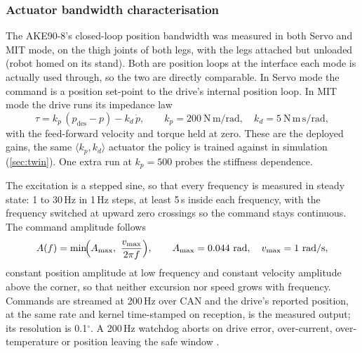 \newpage 

\subsubsection{Actuator bandwidth characterisation}
\label{sec:plant-id-drive}

The AKE90-8's closed-loop position bandwidth was measured in both Servo and MIT mode, on the
thigh joints of both legs, with the legs attached but unloaded (robot homed on its stand). Both are position loops at the interface each mode is actually used through, so the two are
directly comparable. In Servo mode the command is a position set-point to the drive's internal
position loop. In MIT mode the drive runs its impedance law
\begin{equation}
\tau = k_p\,(p_{\mathrm{des}} - p) - k_d\,\dot p,
\qquad k_p = 200\ \mathrm{N\,m/rad},\quad k_d = 5\ \mathrm{N\,m\,s/rad},
\label{eq:mit-impedance}
\end{equation}
with the feed-forward velocity and torque held at zero. These are the deployed gains, the same
$\langle k_p, k_d\rangle$ actuator the policy is trained against in simulation
(\cref{sec:twin}). One extra run at $k_p = 500$ probes the stiffness dependence.

The excitation is a stepped sine, so that every frequency is measured in
steady state: 1 to 30\,Hz in 1\,Hz steps, at least 5\,s inside each frequency, with the frequency
switched at upward zero crossings so the command stays continuous. The command amplitude follows
\begin{equation}
A(f) = \min\!\Bigl(A_{\max},\ \frac{v_{\max}}{2\pi f}\Bigr),
\qquad A_{\max} = 0.044\ \mathrm{rad},\quad v_{\max} = 1\ \mathrm{rad/s},
\label{eq:bode-amplitude}
\end{equation}
constant position amplitude at low frequency and constant velocity amplitude above the corner, so
that neither excursion nor speed grows with frequency. Commands are streamed at 200\,Hz over CAN
and the drive's reported position, at the same rate and kernel time-stamped on reception, is the
measured output; its resolution is 0.1$^\circ$. A 200\,Hz watchdog aborts on drive error,
over-current, over-temperature or position leaving the safe window \cite{morand2026runningrobot}.

